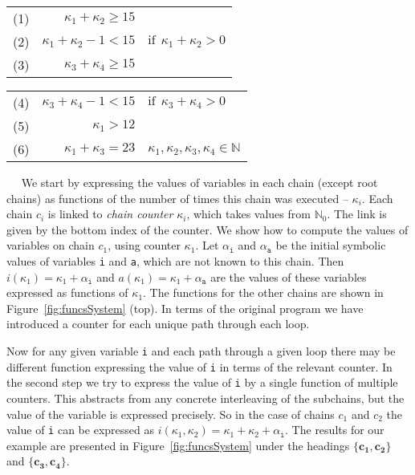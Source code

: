 \documentclass{llncs}
\newcommand{\chn}[1]{\ensuremath{\mathbf{#1}} }
\newcommand{\N}{\mathbb{N}}
\renewcommand{\paragraph}[1]{\vspace{0.2cm}\noindent{\bf #1}~~}
\begin{document}
\begin{figure*}[htbp!]
\bigskip
\begin{tabular}{lrl}
(1) \hspace{0.5cm} & $\kappa_1 + \kappa_2     \geq 15$ \\
(2) & $\kappa_1 + \kappa_2 - 1 < 15$ & \qquad $\textrm{if}~~\kappa_1 + \kappa_2 > 0$ \\
(3) & $\kappa_3 + \kappa_4     \geq 15$ \\
\end{tabular}
\hspace{1.3cm}
\begin{tabular}{lrl}
(4) & $\kappa_3 + \kappa_4 - 1 < 15$ & \qquad $\textrm{if}~~\kappa_3 + \kappa_4 > 0$ \\
(5) & $\kappa_1                > 12$ \\
(6) & $\kappa_1 + \kappa_3     =  23$ & \qquad $\kappa_1,\kappa_2,\kappa_3,\kappa_4 \in \N$
\end{tabular}
 \caption{\textbf{Top:} Recurrent variables expressed as functions of
   counters, including the functions after merging. \newline
\hspace*{.8cm} \textbf{Bottom:} Constraint system $\mathcal{S}(c_0)$ of the root chain $\chn{c_0}$.}
\label{fig:funcsSystem}
\vspace{-.5cm}
\end{figure*}

\paragraph{Phase 2: Building a constraint system}
We start by expressing the values of variables in each chain (except root chains) as functions of the number
of times this chain was executed -- $\kappa_i$. Each chain $c_i$ is linked
to \emph{chain counter} $\kappa_i$, which takes values from $\N_0$. The link
is given by the bottom index of the counter. We show how to compute  the values
of variables on chain $c_1$, using counter $\kappa_1$.  Let
$\alpha_\mathtt{i}$ and $\alpha_\mathtt{a}$ be the initial symbolic values
of variables \texttt{i} and \texttt{a}, which are not known to this chain. Then
$i(\kappa_1) = \kappa_1 + \alpha_\mathtt{i}$ and $a(\kappa_1) = \kappa_1 +
\alpha_\mathtt{a}$ are the values of these variables expressed as functions
of $\kappa_1$. The functions for the other chains are shown in
Figure~\ref{fig:funcsSystem} (top). In terms of the original program we have
introduced a counter for each unique path through each loop.

Now for any given variable \texttt{i} and each path through a given loop
there may be different function expressing the value of \texttt{i} in terms
of the relevant counter. In the second step we try to express the value of
\texttt{i} by a single function of multiple counters.  This abstracts
from any concrete interleaving of the subchains, but the value of the
variable is expressed precisely. So in the case of chains $c_1$ and $c_2$ the value of
\texttt{i} can be expressed as $i(\kappa_1, \kappa_2) = \kappa_1 + \kappa_2
+\alpha_\mathtt{i}$.  The results for our example are presented in
Figure~\ref{fig:funcsSystem} under the headings
$\mathbf{\{c_1,c_2\}}$ and $\mathbf{\{c_3,c_4\}}$.
\end{document}
